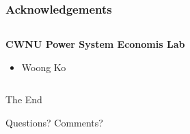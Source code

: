 \documentclass[
	11pt, %
	aspectratio=169, %
]{beamer}
\begin{document}

\begin{frame}
	\frametitle{Acknowledgements}
	
	\begin{columns}[t] %
		\begin{column}{0.45\textwidth} %
			\textbf{CWNU Power System Economis Lab}
			\begin{itemize}
				\item Woong Ko
			\end{itemize}
			
		\end{column}		
		
	\end{columns}
\end{frame}


\begin{frame}[plain] %
	\begin{center}
		{\Huge The End}
		
		\bigskip\bigskip %
		
		{\LARGE Questions? Comments?}
	\end{center}
\end{frame}

\end{document}
